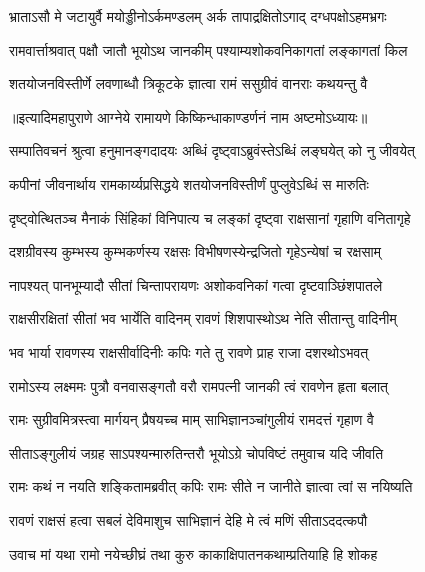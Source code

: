 \twolineshloka
{भ्राताऽसौ मे जटायुर्वै मयोड्डीनोऽर्कमण्डलम्}
{अर्क तापाद्रक्षितोऽगाद् दग्धपक्षोऽहमभ्रगः}%

\twolineshloka
{रामवार्त्ताश्रवात् पक्षौ जातौ भूयोऽथ जानकीम्}
{पश्याम्यशोकवनिकागतां लङ्कागतां किल}%

\twolineshloka
{शतयोजनविस्तीर्णे लवणाब्धौ त्रिकूटके}
{ज्ञात्वा रामं ससुग्रीवं वानराः कथयन्तु वै}%

॥इत्यादिमहापुराणे आग्नेये रामायणे किष्किन्धाकाण्डर्णनं नाम अष्टमोऽध्यायः॥


\twolineshloka
{सम्पातिवचनं श्रुत्वा हनुमानङ्गदादयः}
{अब्धिं दृष्ट्वाऽब्रुवंस्तेऽब्धिं लङ्घयेत् को नु जीवयेत्}%

\twolineshloka
{कपीनां जीवनार्थाय रामकार्य्यप्रसिद्धये}
{शतयोजनविस्तीर्णं पुप्लुवेऽब्धिं स मारुतिः}%

\twolineshloka
{दृष्ट्वोत्थितञ्च मैनाकं सिंहिकां विनिपात्य च }
{लङ्कां दृष्ट्वा राक्षसानां गृहाणि वनितागृहे}%

\twolineshloka
{दशग्रीवस्य कुम्भस्य कुम्भकर्णस्य रक्षसः}
{विभीषणस्येन्द्रजितो गृहेऽन्येषां च रक्षसाम्}%

\twolineshloka
{नापश्यत् पानभूम्यादौ सीतां चिन्तापरायणः}
{अशोकवनिकां गत्वा दृष्टवाञ्छिंशपातले}%

\twolineshloka
{राक्षसीरक्षितां सीतां भव भार्येति वादिनम्}
{रावणं शिशपास्थोऽथ नेति सीतान्तु वादिनीम्}%

\twolineshloka
{भव भार्या रावणस्य राक्षसीर्वादिनीः कपिः}
{गते तु रावणे प्राह राजा दशरथोऽभवत्}%

\twolineshloka
{रामोऽस्य लक्ष्ममः पुत्रौ वनवासङ्गतौ वरौ}
{रामपत्नी जानकी त्वं रावणेन हृता बलात्}%

\twolineshloka
{रामः सुग्रीवमित्रस्त्वा मार्गयन् प्रैषयच्च माम् }
{साभिज्ञानञ्चांगुलीयं रामदत्तं गृहाण वै}%

\twolineshloka
{सीताऽङ्गुलीयं जग्रह साऽपश्यन्मारुतिन्तरौ}
{भूयोऽग्रे चोपविष्टं तमुवाच यदि जीवति}%

\twolineshloka
{रामः कथं न नयति शङ्कितामब्रवीत् कपिः}
{रामः सीते न जानीते ज्ञात्वा त्वां स नयिष्यति}%

\twolineshloka
{रावणं राक्षसं हत्वा सबलं देविमाशुच}
{साभिज्ञानं देहि मे त्वं मणिं सीताऽददत्कपौ}%

\twolineshloka
{उवाच मां यथा रामो नयेच्छीघ्रं तथा कुरु}
{काकाक्षिपातनकथाम्प्रतियाहि हि शोकह}%

